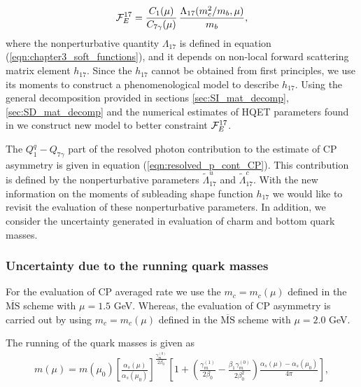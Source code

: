 \begin{equation}\label{F17def}
{\cal F}^{17}_E = \frac{C_1(\mu)}{C_{7\gamma}(\mu)}\,\frac{\Lambda_{17}(m_c^2/m_b,\mu)}{m_b},
\end{equation}
where the nonperturbative quantity $\Lambda_{17}$ is defined in equation (\ref{eqn:chapter3_soft_functions}), and it depends on non-local forward scattering matrix element $h_{17}$. Since the $h_{17}$ cannot be obtained from first principles, we use its moments to construct a phenomenological model to describe $h_{17}$. Using the general decomposition provided in sections \ref{sec:SI_mat_decomp}, \ref{sec:SD_mat_decomp} and the numerical estimates of HQET parameters found in \cite{Gambino:2016jkc} we construct new model to better constraint ${\cal F}^{17}_E$.\par
The $Q^q_1-Q_{7\gamma}$ part of the resolved photon contribution to the estimate of CP asymmetry is given in equation (\ref{eqn:resolved_p_cont_CP}). This contribution is defined by the nonperturbative parameters $\tilde{\Lambda}^u_{17}$ and $\tilde{\Lambda}^c_{17}$. With the new information on the moments of subleading shape function $h_{17}$ we would like to revisit the evaluation of these nonperturbative parameters. In addition, we consider the uncertainty generated in evaluation of charm and bottom quark masses.
\vspace{-0.3cm}
\subsubsection{Uncertainty due to the running quark masses}
\vspace{-0.2cm}
For the evaluation of CP averaged rate we use the $m_c = m_c(\mu)$ defined in the $\overline{\mbox{MS}}$ scheme with $\mu=1.5$ GeV. Whereas, the evaluation of CP asymmetry is carried out by using $m_c = m_c(\mu)$ defined in the $\overline{\mbox{MS}}$ scheme with $\mu=2.0$ GeV.\par
The running of the quark masses is given as \cite{Buras:1998raa}
\vspace{-0.4cm}
\begin{eqnarray}\label{eqn:chap5_running_mass}
m(\mu)=m\left(\mu_{0}\right)\left[\frac{\alpha_{s}(\mu)}{\alpha_{s}\left(\mu_{0}\right)}\right]^{\frac{\gamma_{m}^{(0)}}{2 \beta_{0}}}\left[1+\left(\frac{\gamma_{m}^{(1)}}{2 \beta_{0}}-\frac{\beta_{1} \gamma_{m}^{(0)}}{2 \beta_{0}^{2}}\right) \frac{\alpha_{s}(\mu)-\alpha_{s}\left(\mu_{0}\right)}{4 \pi}\right],
\end{eqnarray}

